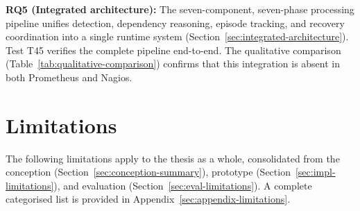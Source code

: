 \textbf{RQ5 (Integrated architecture):} The seven-component, seven-phase processing pipeline unifies detection, dependency reasoning, episode tracking, and recovery coordination into a single runtime system (Section~\ref{sec:integrated-architecture}). Test T45 verifies the complete pipeline end-to-end. The qualitative comparison (Table~\ref{tab:qualitative-comparison}) confirms that this integration is absent in both Prometheus and Nagios.

\section{Limitations}\label{sec:conclusion-limitations}

The following limitations apply to the thesis as a whole, consolidated from the conception (Section~\ref{sec:conception-summary}), prototype (Section~\ref{sec:impl-limitations}), and evaluation (Section~\ref{sec:eval-limitations}). A complete categorised list is provided in Appendix~\ref{sec:appendix-limitations}.

